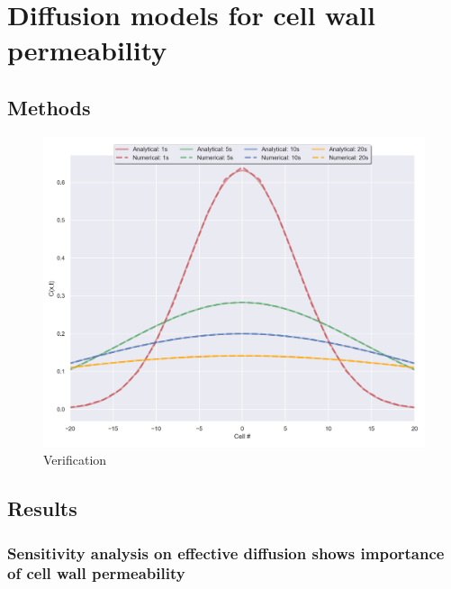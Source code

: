 \documentclass[../main.tex]{subfiles}
\begin{document}
\chapter{Diffusion models for cell wall permeability}
\label{cha:diffusion}

\section{Methods}
\label{sec:diffmodelling}

\begin{figure}[ht]
  \centering
  \includegraphics[width=\columnwidth]{figures/compare_equations.png}
  \caption{\label{fig:analyticalsolutions} Verification}
\end{figure}


\section{Results}


\subsection{Sensitivity analysis on effective diffusion shows importance of cell
  wall permeability}
\end{document}
